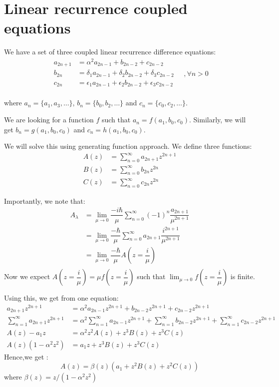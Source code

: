 \documentclass[11pt,a4paper]{article}
\begin{document}
\section{Linear recurrence coupled equations}
We have a set of three coupled linear recurrence difference equations:
\begin{equation}
\boxed{
\begin{aligned}
a_{2n+1}&= \alpha^2 a_{2n-1} + b_{2n-2} + c_{2n-2} \\
b_{2n}&= \delta_1 a_{2n-1} + \delta_2 b_{2n-2} + \delta_3 c_{2n-2} \\
c_{2n} &= \epsilon_1 a_{2n-1} + \epsilon_2 b_{2n-2} + \epsilon_3 c_{2n-2}\\
\end{aligned}}
\quad , \forall n >0
\end{equation}

where $a_n= \{a_1, a_3, \ldots\}$, $b_n= \{b_0, b_2, \ldots\}$ and $c_n= \{c_0, c_2, \ldots\}$.

We are looking for a function $f$ such that $a_n= f(a_1, b_0,c_0)$. Similarly, we will get $b_n= g(a_1, b_0,c_0)$ and $c_n= h(a_1, b_0,c_0)$.

We will solve this using generating function approach. We define three functions:
\begin{align}
A(z)&= \sum_{n=0}^{\infty} a_{2n+1}z^{2n+1}\\
 B(z)&= \sum_{n=0}^{\infty} b_{2n}z^{2n}\\
C(z)&= \sum_{n=0}^{\infty} c_{2n}z^{2n}
\end{align}

Importantly, we note that:
\begin{align*}
A_{\lambda} & =   \lim_{\mu \rightarrow 0}  \dfrac{-i\hbar}{\mu}  \sum_{n=0}^{\infty} (-1)^{n} \dfrac{ a_{2n+1}}{\mu^{2n+1}}\\
& =   \lim_{\mu \rightarrow 0}  \dfrac{-\hbar}{\mu}  \sum_{n=0}^{\infty}  a_{2n+1} \dfrac{i^{2n+1} }{\mu^{2n+1}}\\
&=   \lim_{\mu \rightarrow 0}  \dfrac{-\hbar}{\mu}  A\left( z=\dfrac{i}{\mu}\right)\\
\end{align*}
Now we expect $ A\left( z=\dfrac{i}{\mu}\right)= \mu f(z=\dfrac{i}{\mu})$ such that $\lim_{\mu \rightarrow 0} f(z=\dfrac{i}{\mu}) $ is finite.


Using this, we get from one equation:
\begin{align}
a_{2n+1}  z^{2n+1}&= \alpha^2 a_{2n-1} z^{2n+1} + b_{2n-2} z^{2n+1} + c_{2n-2} z^{2n+1}\\
\sum_{n=1}^{\infty} a_{2n+1}  z^{2n+1}&= \alpha^2  \sum_{n=1}^{\infty} a_{2n-1} z^{2n+1} +  \sum_{n=1}^{\infty} b_{2n-2} z^{2n+1} +  \sum_{n=1}^{\infty}c_{2n-2} z^{2n+1}\\
A(z) -a_1 z &=\alpha^2  z^2 A(z) +  z^3 B(z) + z^3 C(z)\\
A(z)(1 -\alpha^2  z^2 )  &=  a_1 z +  z^3 B(z) + z^3 C(z)
\end{align}
Hence,we get :
\begin{equation}
\boxed{A(z) =  \beta(z) (a_1  +  z^2 B(z) + z^2 C(z))}
\end{equation}
where $\beta(z)= z/(1 -\alpha^2  z^2 )$
\end{document}
